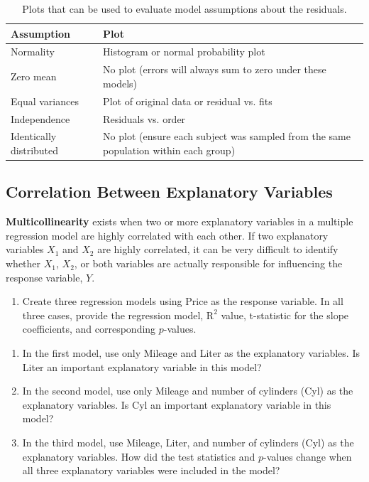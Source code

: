 \documentclass[
]{book}
\providecommand{\tightlist}{%
  \setlength{\itemsep}{0pt}\setlength{\parskip}{0pt}}
\begin{document}
\begin{table}[!h]
\centering
\caption{\label{tab:tab31}Plots that can be used to evaluate model assumptions about the residuals.}
\centering
\begin{tabular}[t]{ll}
\toprule
Assumption & Plot\\
\midrule
Normality & Histogram or normal probability plot\\
Zero mean & No plot (errors will always sum to zero under these models)\\
Equal variances & Plot of original data or residual vs. fits\\
Independence & Residuals vs. order\\
Identically distributed & No plot (ensure each subject was sampled from the same population within each group)\\
\bottomrule
\end{tabular}
\end{table}

\hypertarget{correlation-between-explanatory-variables}{%
\subsection*{Correlation Between Explanatory Variables}\label{correlation-between-explanatory-variables}}

\textbf{Multicollinearity} exists when two or more explanatory variables in a multiple regression model are highly correlated with each other. If two explanatory variables \(X_1\) and \(X_2\) are highly correlated, it can be very difficult to identify whether \(X_1\), \(X_2\), or both variables are actually responsible for influencing the response variable, \(Y\).

\begin{enumerate}
\def\labelenumi{\arabic{enumi}.}
\setcounter{enumi}{13}
\tightlist
\item
  Create three regression models using Price as the response variable. In all three cases, provide the regression model, \(\mathrm{R}^2\) value, t-statistic for the slope coefficients, and corresponding \(p\)-values.
\end{enumerate}

\begin{enumerate}
\def\labelenumi{\alph{enumi}.}
\tightlist
\item
  In the first model, use only Mileage and Liter as the explanatory variables. Is Liter an important explanatory variable in this model?
\item
  In the second model, use only Mileage and number of cylinders (Cyl) as the explanatory variables. Is Cyl an important explanatory variable in this model?
\item
  In the third model, use Mileage, Liter, and number of cylinders (Cyl) as the explanatory variables. How did the test statistics and \(p\)-values change when all three explanatory variables were included in the model?
\end{enumerate}
\end{document}
